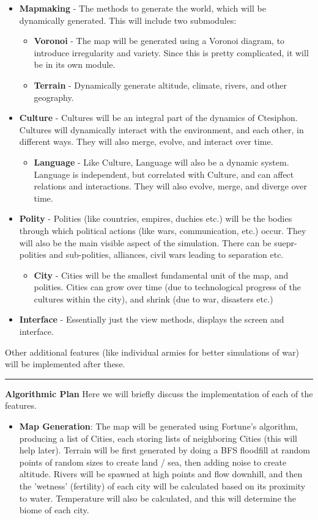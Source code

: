 \documentclass[11pt, onecolumn]{article}
\begin{document}
{\begin{itemize}
    \item \textbf{Mapmaking} - The methods to generate the world, which will be dynamically generated. This will include two submodules:
    \begin{itemize}
        \item \textbf{Voronoi} - The map will be generated using a Voronoi diagram, to introduce irregularity and variety. Since this is pretty complicated, it will be in its own module.
        \item \textbf{Terrain} - Dynamically generate altitude, climate, rivers, and other geography.
    \end{itemize}
    \item \textbf{Culture} - Cultures will be an integral part of the dynamics of Ctesiphon. Cultures will dynamically interact with the environment, and each other, in different ways. They will also merge, evolve, and interact over time.
    \begin{itemize}
        \item \textbf{Language} - Like Culture, Language will also be a dynamic system. Language is independent, but correlated with Culture, and can affect relations and interactions. They will also evolve, merge, and diverge over time.
    \end{itemize}
    \item \textbf{Polity} - Polities (like countries, empires, duchies etc.) will be the bodies through which political actions (like wars, communication, etc.) occur. They will also be the main visible aspect of the simulation. There can be suepr-polities and sub-polities, alliances, civil wars leading to separation etc.
    \begin{itemize}
        \item \textbf{City} - Cities will be the smallest fundamental unit of the map, and polities. Cities can grow over time (due to technological progress of the cultures within the city), and shrink (due to war, disasters etc.)
    \end{itemize}
    \item \textbf{Interface} - Essentially just the view methods, displays the screen and interface.
\end{itemize}

Other additional features (like individual armies for better simulations of war) will be implemented after these.
\\
\hrule
\textbf{\large{Algorithmic Plan}}
Here we will briefly discuss the implementation of each of the features.
\begin{itemize}
    \item \textbf{Map Generation}: The map will be generated using Fortune's algorithm, producing a list of Cities, each storing lists of neighboring Cities (this will help later). Terrain will be first generated by doing a BFS floodfill at random points of random sizes to create land / sea, then adding noise to create altitude. Rivers will be spawned at high points and flow downhill, and then the 'wetness' (fertility) of each city will be calculated based on its proximity to water. Temperature will also be calculated, and this will determine the biome of each city.


\end{itemize}}
\end{document}

